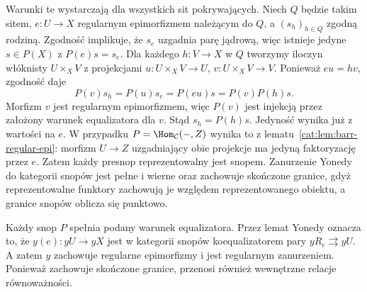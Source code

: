 Warunki te wystarczają dla wszystkich sit pokrywających. Niech $Q$ będzie takim sitem, $e:U\to X$ regularnym epimorfizmem należącym do $Q$, a $(s_h)_{h\in Q}$ zgodną rodziną. Zgodność implikuje, że $s_e$ uzgadnia parę jądrową, więc istnieje jedyne $s\in P(X)$ z $P(e)s=s_e$. Dla każdego $h:V\to X$ w $Q$ tworzymy iloczyn włóknisty $U\times_X V$ z projekcjami $u:U\times_X V\to U$, $v:U\times_X V\to V$. Ponieważ $eu=hv$, zgodność daje
\[
 P(v)s_h=P(u)s_e=P(eu)s=P(v)P(h)s.
\]
Morfizm $v$ jest regularnym epimorfizmem, więc $P(v)$ jest injekcją przez założony warunek equalizatora dla $v$. Stąd $s_h=P(h)s$. Jedyność wynika już z wartości na $e$. W przypadku $P=\Hom_{\mathcal C}(-,Z)$ wynika to z lematu~\ref{cat:lem:barr-regular-epi}: morfizm $U\to Z$ uzgadniający obie projekcje ma jedyną faktoryzację przez $e$. Zatem każdy presnop reprezentowalny jest snopem. Zanurzenie Yonedy do kategorii snopów jest pełne i wierne oraz zachowuje skończone granice, gdyż reprezentowalne funktory zachowują je względem reprezentowanego obiektu, a granice snopów oblicza się punktowo.

Każdy snop $P$ spełnia podany warunek equalizatora. Przez lemat Yonedy oznacza to, że $y(e):yU\to yX$ jest w kategorii snopów koequalizatorem pary $yR_e\rightrightarrows yU$. A zatem $y$ zachowuje regularne epimorfizmy i jest regularnym zanurzeniem. Ponieważ zachowuje skończone granice, przenosi również wewnętrzne relacje równoważności.

